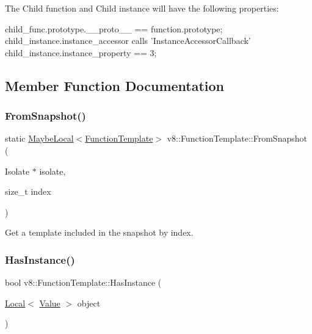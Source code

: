 The Child function and Child instance will have the following properties\+:


\begin{DoxyCode}
child\_func.prototype.\_\_proto\_\_ == \textcolor{keyword}{function}.prototype;
child\_instance.instance\_accessor calls \textcolor{stringliteral}{'InstanceAccessorCallback'}
child\_instance.instance\_property == 3;
\end{DoxyCode}
 

\subsection{Member Function Documentation}
\mbox{\label{classv8_1_1FunctionTemplate_acd9eaca4c7d6de89949b8e1c41f4ba46}} 
\subsubsection{\texorpdfstring{From\+Snapshot()}{FromSnapshot()}}
{\footnotesize\ttfamily static \mbox{\hyperlink{classv8_1_1MaybeLocal}{Maybe\+Local}}$<$\mbox{\hyperlink{classv8_1_1FunctionTemplate}{Function\+Template}}$>$ v8\+::\+Function\+Template\+::\+From\+Snapshot (\begin{DoxyParamCaption}\item[{Isolate $\ast$}]{isolate,  }\item[{size\+\_\+t}]{index }\end{DoxyParamCaption})\hspace{0.3cm}{\ttfamily [static]}}

Get a template included in the snapshot by index. \mbox{\label{classv8_1_1FunctionTemplate_a90d838f3456d300bd19d2a2cb98645bd}} 
\subsubsection{\texorpdfstring{Has\+Instance()}{HasInstance()}}
{\footnotesize\ttfamily bool v8\+::\+Function\+Template\+::\+Has\+Instance (\begin{DoxyParamCaption}\item[{\mbox{\hyperlink{classv8_1_1Local}{Local}}$<$ \mbox{\hyperlink{classv8_1_1Value}{Value}} $>$}]{object }\end{DoxyParamCaption})}

